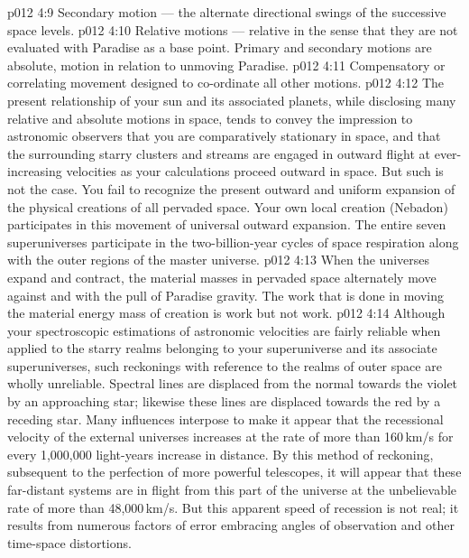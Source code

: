 \vs p012 4:9 \bibnobreakspace Secondary motion --- the alternate directional swings of the successive space levels.
\vs p012 4:10 \bibnobreakspace Relative motions --- relative in the sense that they are not evaluated with Paradise as a base point. Primary and secondary motions are absolute, motion in relation to unmoving Paradise.
\vs p012 4:11 \bibnobreakspace Compensatory or correlating movement designed to co\hyp{}ordinate all other motions.
\vs p012 4:12 \pc The present relationship of your sun and its associated planets, while disclosing many relative and absolute motions in space, tends to convey the impression to astronomic observers that you are comparatively stationary in space, and that the surrounding starry clusters and streams are engaged in outward flight at ever\hyp{}increasing velocities as your calculations proceed outward in space. But such is not the case. You fail to recognize the present outward and uniform expansion of the physical creations of all pervaded space. Your own local creation (Nebadon) participates in this movement of universal outward expansion. The entire seven superuniverses participate in the two\hyp{}billion\hyp{}year cycles of space respiration along with the outer regions of the master universe.
\vs p012 4:13 When the universes expand and contract, the material masses in pervaded space alternately move against and with the pull of Paradise gravity. The work that is done in moving the material energy mass of creation is  work but not  work.
\vs p012 4:14 \pc Although your spectroscopic estimations of astronomic velocities are fairly reliable when applied to the starry realms belonging to your superuniverse and its associate superuniverses, such reckonings with reference to the realms of outer space are wholly unreliable. Spectral lines are displaced from the normal towards the violet by an approaching star; likewise these lines are displaced towards the red by a receding star. Many influences interpose to make it appear that the recessional velocity of the external universes increases at the rate of more than 160\,km/s for every 1,000,000 light\hyp{}years increase in distance. By this method of reckoning, subsequent to the perfection of more powerful telescopes, it will appear that these far\hyp{}distant systems are in flight from this part of the universe at the unbelievable rate of more than 48,000\,km/s. But this apparent speed of recession is not real; it results from numerous factors of error embracing angles of observation and other time\hyp{}space distortions.
